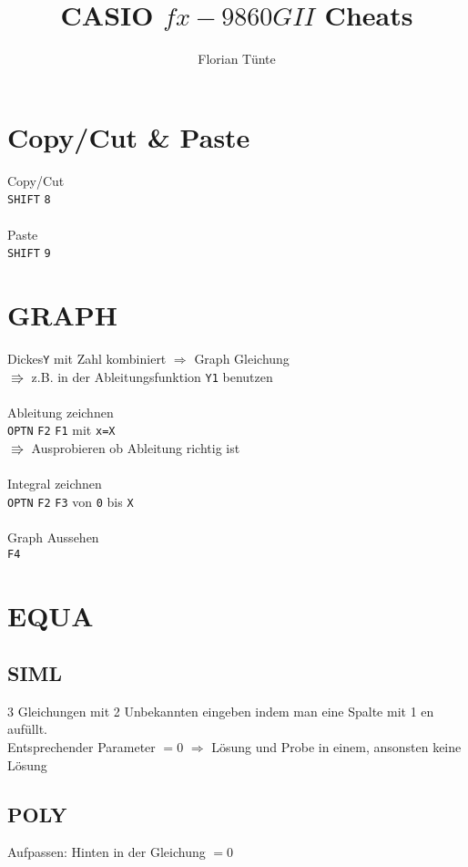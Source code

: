 \documentclass[12pt,a4paper,landscape]{article}
\title{CASIO $fx-9860GII$ \glqq Cheats\grqq}
\author{Florian Tünte}
\def\g#1{\texttt{#1}}
\begin{document}
	\maketitle
	
	\pagebreak
	
	\pagebreak
	
		\section{Copy/Cut \& Paste}
	Copy/Cut\\
	\g{SHIFT} \g{8}\\\\
	Paste\\
	\g{SHIFT} \g{9}
	\pagebreak
	
	
	\section{GRAPH}
	\glqq Dickes\grqq \space \g{Y} mit Zahl kombiniert $\Rightarrow$ Graph Gleichung\\
	$ \Rrightarrow $ z.B. in der Ableitungsfunktion \g{Y1} benutzen\\\\
	Ableitung zeichnen\\
	\g{OPTN} \g{F2} \g{F1}  mit \g{x=X}\\
	$ \Rrightarrow $ Ausprobieren ob Ableitung richtig ist\\\\
	Integral zeichnen\\
	\g{OPTN} \g{F2} \g{F3}  von \g{0} bis \g{X}\\\\
	Graph Aussehen\\
	\g{F4}
	\pagebreak
	
	
	 \section{EQUA}
	 
	\subsection{SIML}
	3 Gleichungen mit 2 Unbekannten eingeben indem man eine Spalte mit 1 en auf\"ullt.\\
	Entsprechender Parameter $=0$ $\Rightarrow$ L\"osung und Probe in einem, ansonsten keine Lösung
	
	\subsection{POLY}
	Aufpassen: Hinten in der Gleichung $=0$
	
\end{document}
